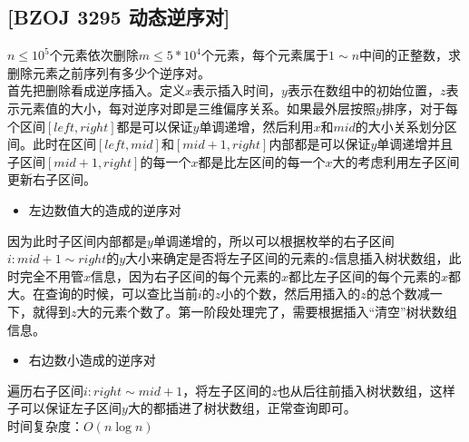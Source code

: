 \subsection{[BZOJ 3295 动态逆序对]}
$n\leq 10^5$个元素依次删除$m\leq 5*10^4 $个元素，每个元素属于$1\sim n$中间的正整数，求删除元素之前序列有多少个逆序对。\\

首先把删除看成逆序插入。定义$x$表示插入时间，$y$表示在数组中的初始位置，$z$表示元素值的大小，每对逆序对即是三维偏序关系。如果最外层按照$y$排序，对于每个区间$[left,right]$都是可以保证$y$单调递增，然后利用$x$和$mid$的大小关系划分区间。此时在区间$[left,mid]$和$[mid+1,right]$内部都是可以保证$y$单调递增并且子区间$[mid+1,right]$的每一个$x$都是比左区间的每一个$x$大的考虑利用左子区间更新右子区间。
\begin{itemize}
\item 左边数值大的造成的逆序对
\end{itemize}
因为此时子区间内部都是$y$单调递增的，所以可以根据枚举的右子区间$i:mid+1\sim right$的$y$大小来确定是否将左子区间的元素的$z$信息插入树状数组，此时完全不用管$x$信息，因为右子区间的每个元素的$x$都比左子区间的每个元素的$x$都大。在查询的时候，可以查比当前$i$的$z$小的个数，然后用插入的$z$的总个数减一下，就得到$z$大的元素个数了。第一阶段处理完了，需要根据插入“清空”树状数组信息。
\begin{itemize}
\item 右边数小造成的逆序对
\end{itemize}
遍历右子区间$i:right\sim mid+1$，将左子区间的$z$也从后往前插入树状数组，这样子可以保证左子区间$y$大的都插进了树状数组，正常查询即可。\\
时间复杂度：$O(n\log n)$
